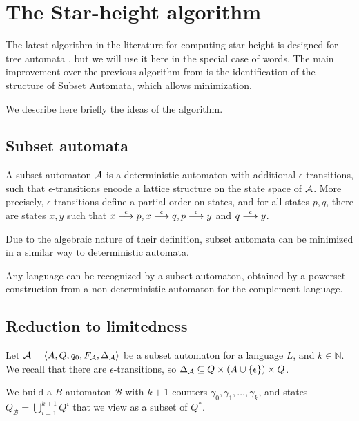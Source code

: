 \newcommand{\cB}{\mathcal B}

\section{The Star-height algorithm}

The latest algorithm in the literature for computing star-height is designed for tree automata \cite{CL08sh}, but we will use it here in the special case of words. The main improvement over the previous algorithm from \cite{Kirsten05} is the identification of the structure of Subset Automata, which allows minimization.

We describe here briefly the ideas of the algorithm.

\subsection{Subset automata}

\begin{definition}\cite{CL08sh}
A subset automaton $\mathcal{A}$ is a deterministic automaton with additional $\epsilon$-transitions, such that $\epsilon$-transitions encode a lattice structure on the state space of $\mathcal{A}$. More precisely, $\epsilon$-transitions define a partial order on states, and for all states $p,q$, there are states $x,y$ such that $x\stackrel{\epsilon}{\longrightarrow}p, x\stackrel{\epsilon}{\longrightarrow}q, p\stackrel{\epsilon}{\longrightarrow}y$ and $q\stackrel{\epsilon}{\longrightarrow}y$.
\end{definition}

Due to the algebraic nature of their definition, subset automata can be minimized in a similar way to deterministic automata.

\begin{theorem}\cite{CL08sh}
Any language can be recognized by a subset automaton, obtained by a powerset construction from a non-deterministic automaton for the complement language.
\end{theorem}

\subsection{Reduction to limitedness}

Let $\mathcal{A}=\langle A,Q,q_0,F_{\mathcal{A}},\Delta_{\mathcal{A}} \rangle$ be a subset automaton for a language $L$, and $k\in \mathbb N$. We recall that there are $\epsilon$-transitions, so $\Delta_{\mathcal{A}}\subseteq Q\times (A\cup\{\epsilon\})\times Q$.

We build a $B$-automaton $\cB$ with $k+1$ counters $\gamma_0,\gamma_1,\dots,\gamma_k$, and states $Q_\cB=\bigcup_{i=1}^{k+1} Q^i$ that we view as a subset of $Q^*$.

